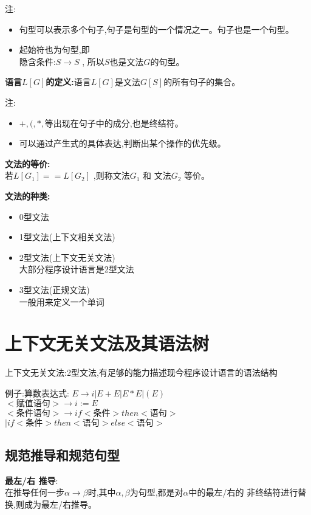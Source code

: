 \documentclass[UTF8,a4paper]{ctexart}
\newcommand{\spaceline}{\vspace{\baselineskip}}
\begin{document}
    注:
    \begin{itemize}
      \item 句型可以表示多个句子,句子是句型的一个情况之一。句子也是一个句型。
      \item 起始符也为句型,即\\
      隐含条件:$S\to S$ , 所以$S$也是文法$G$的句型。
    \end{itemize}

    \spaceline
    \textbf{语言$L[G]$的定义:}语言$L[G]$是文法$G[S]$的所有句子的集合。

    注:
    \begin{itemize}
      \item $+,(,*,$等出现在句子中的成分,也是终结符。
      \item 可以通过产生式的具体表达,判断出某个操作的优先级。
    \end{itemize}

    \spaceline
    \textbf{文法的等价:}\\
    若$L[G_1] == L[G_2]$ ,则称文法$G_1$ 和 文法$G_2$ 等价。

    \spaceline
    \textbf{文法的种类:}
    \begin{itemize}
      \item 0型文法
      \item 1型文法(上下文相关文法)
      \item 2型文法(上下文无关文法)\\
      大部分程序设计语言是2型文法
      \item 3型文法(正规文法)\\
      一般用来定义一个单词
    \end{itemize}

  \section{上下文无关文法及其语法树}
  上下文无关文法:2型文法,有足够的能力描述现今程序设计语言的语法结构

  例子:算数表达式:
  $E\to i|E+E|E*E|(E)$\\
  $<\text{赋值语句}> \to i := E$\\
  $<\text{条件语句}> \to if <\text{条件}> then <\text{语句}>$\\
  $| if <\text{条件}> then <\text{语句}> else <\text{语句}>$

  \subsection{规范推导和规范句型}
  \textbf{最左/右 推导}:\\
  在推导任何一步$\alpha\to \beta$时,其中$\alpha,\beta$为句型,都是对$\alpha$中的最左/右的
  非终结符进行替换,则成为最左/右推导。
\end{document}
